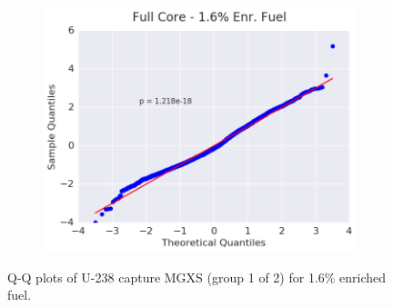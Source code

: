 \begin{figure}[h!]
\begin{subfigure}{0.5\textwidth}
  \includegraphics[width=\linewidth]{figures/patterns/full-core/quantile/16-enr-capt-1} \caption{}
  \label{fig:chap9-qq-full-core-1.6-capt}
\end{subfigure}
\caption[Q-Q plots of U-238 capture MGXS for 1.6\% enriched fuel]{\ac{Q-Q} plots of U-238 capture \ac{MGXS} (group 1 of 2) for 1.6\% enriched fuel.}
\label{fig:chap9-qq-1.6-capt}
\end{figure}

